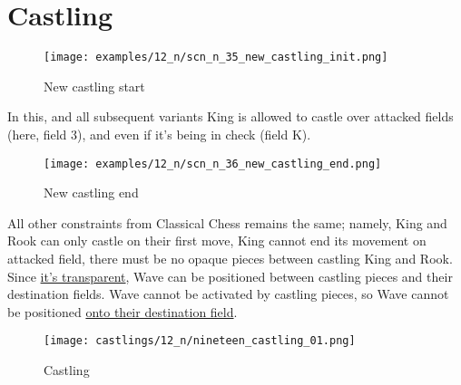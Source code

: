 \clearpage %

\section*{Castling}
\label{sec:Nineteen/Castling}

\vspace*{-1.7\baselineskip}
\noindent
\begin{figure}[!h]
\texttt{[image: examples/12\_n/scn\_n\_35\_new\_castling\_init.png]}
\vspace*{-1.4\baselineskip}
\caption{New castling start}
\label{fig:scn_n_35_new_castling_init}
\end{figure}

\vspace*{-0.7\baselineskip}
In this, and all subsequent variants King is allowed to castle over attacked fields
(here, field 3), and even if it's being in check (field K).

\vspace*{-0.7\baselineskip}
\noindent
\begin{figure}[!h]
\texttt{[image: examples/12\_n/scn\_n\_36\_new\_castling\_end.png]}
\vspace*{-1.4\baselineskip}
\caption{New castling end}
\label{fig:scn_n_36_new_castling_end}
\end{figure}

\vspace*{-0.7\baselineskip}
All other constraints from Classical Chess remains the same; namely, King and Rook
can only castle on their first move, King cannot end its movement on attacked field,
there must be no opaque pieces between castling King and Rook. %
Since \hyperref[fig:scn_mv_011_wave_is_transparent]{it's transparent}, Wave can be
positioned between castling pieces and their destination fields.
Wave cannot be activated by castling pieces, so Wave cannot be positioned
\hyperref[fig:scn_mv_015_wave_block_castling_rook]{onto their destination field}.

\vspace*{-0.7\baselineskip}
\noindent
\begin{figure}[!h]
\texttt{[image: castlings/12\_n/nineteen\_castling\_01.png]}
\vspace*{-1.4\baselineskip}
\caption{Castling}
\label{fig:nineteen_castling_01}
\end{figure}

